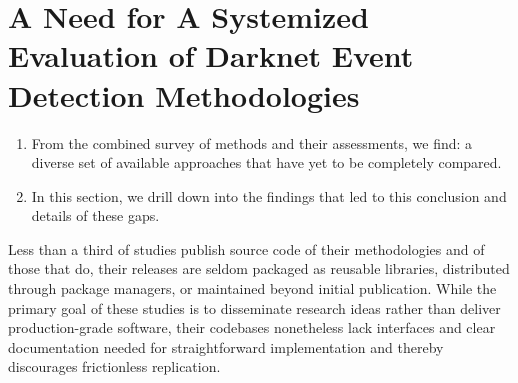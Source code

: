 \documentclass[manuscript,nonacm]{acmart}
\begin{document}

\section{A Need for A Systemized Evaluation of Darknet Event Detection Methodologies}

\begin{enumerate}
    \item From the combined survey of methods and their assessments, we find: a diverse set of available approaches that have yet to be completely compared.
    \item In this section, we drill down into the findings that led to this conclusion and details of these gaps.
\end{enumerate}

Less than a third of studies publish source code of their methodologies and of those that do, their releases are seldom packaged as reusable libraries, distributed through package managers, or maintained beyond initial publication. 
While the primary goal of these studies is to disseminate research ideas rather than deliver production-grade software, their codebases nonetheless lack interfaces and clear documentation needed for straightforward implementation and thereby discourages frictionless replication.
\end{document}
